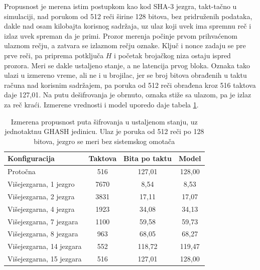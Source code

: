 Propusnost je merena istim postupkom kao kod SHA-3 jezgra, takt-tačno u simulaciji, nad porukom od 512 reči širine 128 bitova, bez pridruženih podataka, dakle nad osam kilobajta korisnog sadržaja, uz ulaz koji uvek ima spremnu reč i izlaz uvek spreman da je primi. Prozor merenja počinje prvom prihvaćenom ulaznom rečju, a zatvara se izlaznom rečju oznake. Ključ i nonce zadaju se pre prve reči, pa priprema potključa $H$ i početak brojačkog niza ostaju ispred prozora. Meri se dakle ustaljeno stanje, a ne latencija prvog bloka. Oznaka tako ulazi u izmereno vreme, ali ne i u brojilac, jer se broj bitova obrađenih u taktu računa nad korisnim sadržajem, pa poruka od 512 reči obrađena kroz 516 taktova daje 127,01. Na putu dešifrovanja je obrnuto, oznaka stiže sa ulazom, pa je izlaz za reč kraći. Izmerene vrednosti i model uporedo daje tabela \ref{tab:aes_bpc}.

\begin{table}[H]
\caption{Izmerena propusnost puta šifrovanja u ustaljenom stanju, uz jednotaktnu GHASH jedinicu. Ulaz je poruka od 512 reči po 128 bitova, jezgro se meri bez sistemskog omotača}
\centering
{\renewcommand{\arraystretch}{1.25}\setlength{\tabcolsep}{10pt}
\begin{tabular}{|l|c|c|c|}
\hline
\rowcolor{gray!30}
Konfiguracija & Taktova & Bita po taktu & Model \\
\hline
Protočna                & 516  & 127,01 & 128,00 \\
\hline
Višejezgarna, 1 jezgro   & 7670 & 8,54   & 8,53 \\
\hline
Višejezgarna, 2 jezgra   & 3831 & 17,11  & 17,07 \\
\hline
Višejezgarna, 4 jezgra   & 1923 & 34,08  & 34,13 \\
\hline
Višejezgarna, 7 jezgara  & 1100 & 59,58  & 59,73 \\
\hline
Višejezgarna, 8 jezgara  & 963  & 68,05  & 68,27 \\
\hline
Višejezgarna, 14 jezgara & 552  & 118,72 & 119,47 \\
\hline
Višejezgarna, 15 jezgara & 516  & 127,01 & 128,00 \\
\hline
\end{tabular}
}
\label{tab:aes_bpc}
\end{table}

